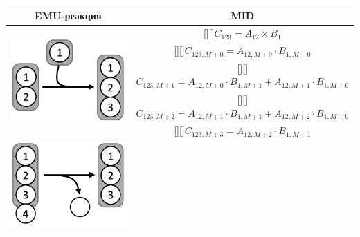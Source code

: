 \documentclass[14pt, a4paper]{extreport}
\newcommand{\adj}[1]{\raisebox{-2pt}[\height][\depth]{#1}}
\begin{document}
\clearpage

\begin{table}
	\begin{center}
		\begin{tabular}{c | c}
			\hline
			EMU-реакция & MID\\
			\hline
			\multirow{5}{*}[-1mm]{
				\begin{minipage}{0.3\linewidth}
					\centering{Реакция конденсации}
					\includegraphics[scale=0.85]{EMU_reaction_1.png}
				\end{minipage}
			} 
			  & \adj{$C_{123} = A_{12} \times B_1$}\\[0.5ex]
			  & \adj{$C_{123,M+0} = A_{12,M+0} \cdot B_{1,M+0}$}\\ [0.5ex]
			  & \adj{$C_{123,M+1} = A_{12,M+0} \cdot B_{1,M+1} + A_{12,M+1} \cdot B_{1,M+0}$}\\ [0.5ex]
			  & \adj{$C_{123,M+2} = A_{12,M+1} \cdot B_{1,M+1} + A_{12,M+2} \cdot B_{1,M+0}$}\\ [0.5ex]
			  & \adj{$C_{123,M+3} = A_{12,M+2} \cdot B_{1,M+1}$} \\ [0.5ex]
			 \hline 
			 \multirow{5}{*}[-1mm]{
			 	\begin{minipage}{0.3\linewidth}
			 		\centering{Реакция расщепления}
			 		\includegraphics[scale=0.85]{EMU_reaction_2.png}

\end{minipage}}
\end{tabular}
\end{center}
\end{table}
\end{document}
